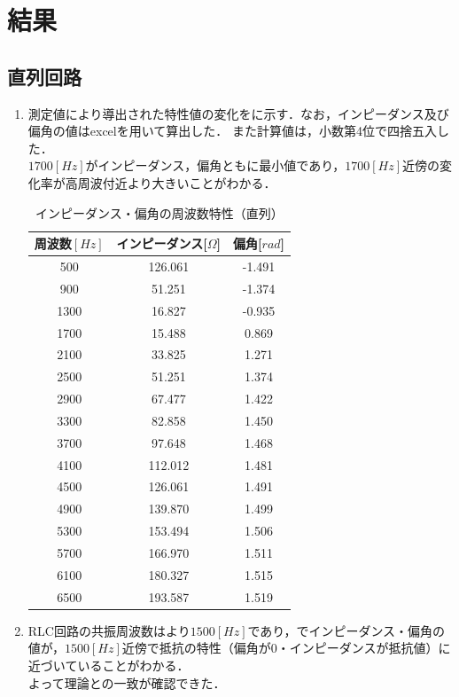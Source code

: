 \documentclass[11pt,dvipdfmx]{jarticle}
\begin{document}
\section{結果}
\subsection{直列回路}
\begin{enumerate}
\item 測定値により導出された特性値の変化をに示す．なお，インピーダンス及び偏角の値はexcelを用いて算出した．
また計算値は，小数第4位で四捨五入した．\\
$1700[Hz]$がインピーダンス，偏角ともに最小値であり，$1700[Hz]$近傍の変化率が高周波付近より大きいことがわかる．
\begin{table}[hbtp]
  \centering
  \caption{インピーダンス・偏角の周波数特性（直列）}
  \label{tab:2}
  \begin{tabular}{ccc}
    \hline
    周波数$[Hz]$&インピーダンス[$\Omega$]&偏角[$rad$]\\
    \hline
    500  & 126.061 & -1.491 \\
    900  & 51.251 & -1.374 \\
    1300 & 16.827 & -0.935 \\
    1700 & 15.488 & 0.869 \\
    2100 & 33.825 & 1.271 \\
    2500 & 51.251 & 1.374 \\
    2900 & 67.477 & 1.422 \\
    3300 & 82.858 & 1.450 \\
    3700 & 97.648 & 1.468 \\
    4100 & 112.012 & 1.481 \\
    4500 & 126.061 & 1.491 \\
    4900 & 139.870 & 1.499 \\
    5300 & 153.494 & 1.506 \\
    5700 & 166.970 & 1.511 \\
    6100 & 180.327 & 1.515 \\
    6500 & 193.587 & 1.519 \\
    \hline
  \end{tabular}
\end{table}
\item RLC回路の共振周波数はより$1500[Hz]$であり，でインピーダンス・偏角の値が，$1500[Hz]$近傍で抵抗の特性（偏角が0・インピーダンスが抵抗値）に近づいていることがわかる．\\
よって理論との一致が確認できた．

\end{enumerate}
\end{document}
